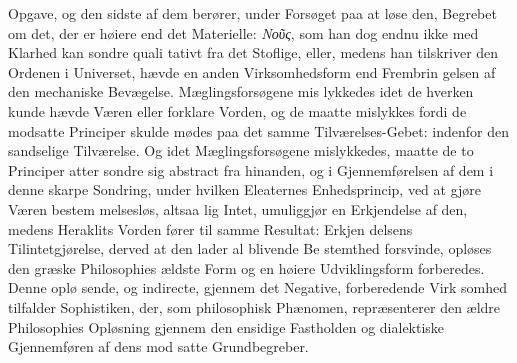 \documentclass[12pt,a4paper]{book}
\newcommand{\gk}[1]{\textit{#1}}
\begin{document}
Opgave, og den sidste af dem berører, under Forsøget paa at
løse den, Begrebet om det, der er høiere end det Materielle:
\gk{Νοῦς}, som han dog endnu ikke med Klarhed kan sondre quali\-%
tativt fra det Stoflige, eller, medens han tilskriver den Ordenen
i Universet, hævde en anden Virksomhedsform end Frembrin\-%
gelsen af den mechaniske Bevægelse. Mæglingsforsøgene mis\-%
lykkedes idet de hverken kunde hævde Væren eller forklare
Vorden, og de maatte mislykkes fordi de modsatte Principer
skulde mødes paa det samme Tilværelses-Gebet: indenfor den
sandselige Tilværelse. Og idet Mæglingsforsøgene mislykkedes,
maatte de to Principer atter sondre sig abstract fra hinanden,
og i Gjennemførelsen af dem i denne skarpe Sondring, under
hvilken Eleaternes Enhedsprincip, ved at gjøre Væren bestem\-%
melsesløs, altsaa lig Intet, umuliggjør en Erkjendelse af den,
medens Heraklits Vorden fører til samme Resultat: Erkjen\-%
delsens Tilintetgjørelse, derved at den lader al blivende Be\-%
stemthed forsvinde, opløses den græske Philosophies ældste
Form og en høiere Udviklingsform forberedes. Denne oplø\-%
sende, og indirecte, gjennem det Negative, forberedende Virk\-%
somhed tilfalder Sophistiken, der, som philosophisk Phænomen,
repræsenterer den ældre Philosophies Opløsning gjennem den
ensidige Fastholden og dialektiske Gjennemføren af dens mod\-%
satte Grundbegreber.
\end{document}
